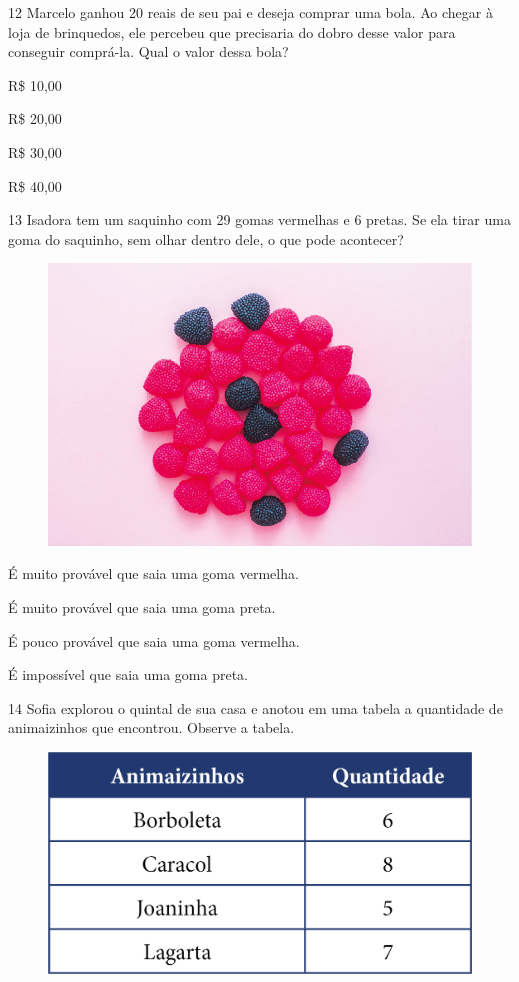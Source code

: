 \num{12} Marcelo ganhou 20 reais de seu pai e deseja comprar uma bola. Ao chegar
à loja de brinquedos, ele percebeu que precisaria do dobro desse valor
para conseguir comprá-la. Qual o valor dessa bola?

\begin{escolha}[itemsep=-5pt]
\item R\$ 10,00

\item R\$ 20,00

\item R\$ 30,00

\item R\$ 40,00
\end{escolha}

\pagebreak
\num{13} Isadora tem um saquinho com 29 gomas vermelhas e 6 pretas. Se ela tirar
uma goma do saquinho, sem olhar dentro dele, o que pode acontecer?

\begin{figure}[H]
\centering
\includegraphics[width=.6\textwidth]{./media/image132.png}
\end{figure}

\begin{escolha}[itemsep=-5pt]
\item É muito provável que saia uma goma vermelha.

\item É muito provável que saia uma goma preta.

\item É pouco provável que saia uma goma vermelha.

\item É impossível que saia uma goma preta.
\end{escolha}


\num{14} Sofia explorou o quintal de sua casa e anotou em uma tabela a quantidade
de animaizinhos que encontrou. Observe a tabela.

\begin{figure}[H]
\centering
\includegraphics[width=.7\textwidth]{./media/image135.png}
\end{figure}


